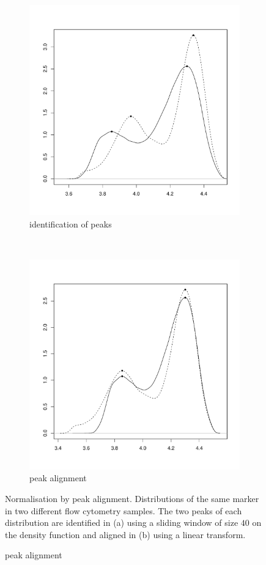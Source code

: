 \begin{figure}[h]
\begin{subfigure}[b]{.5\textwidth}
\centering
\includegraphics[scale=.4]{figures/normalisation-peaks-a.pdf} 
\caption{identification of peaks}
\end{subfigure}
~
\begin{subfigure}[b]{.5\textwidth}
\centering
\includegraphics[scale=.4]{figures/normalisation-peaks-b.pdf} 
\caption{peak alignment}
\end{subfigure}
{Normalisation by peak alignment.}
{
  Distributions of the same marker in two different flow cytometry samples.
  The two peaks of each distribution are identified in (a) using a sliding window of size $40$ on the density function and aligned in (b) using a linear transform.
}
\end{figure}
